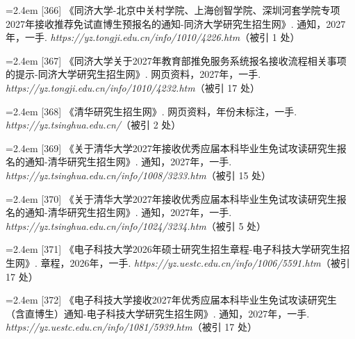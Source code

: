 {\vspace{0.6pt}
\noindent\hangindent=2.4em \label{src:S0488}{\color{cAccent}[366]} 《同济大学-北京中关村学院、上海创智学院、深圳河套学院专项2027年接收推荐免试直博生预报名的通知-同济大学研究生招生网》. 通知，2027年，一手. \textit{https://yz.tongji.edu.cn/info/1010/4226.htm}（被引 1 处）\par
\vspace{0.6pt}
\noindent\hangindent=2.4em \label{src:S0489}{\color{cAccent}[367]} 《同济大学关于2027年教育部推免服务系统报名接收流程相关事项的提示-同济大学研究生招生网》. 网页资料，2027年，一手. \textit{https://yz.tongji.edu.cn/info/1010/4232.htm}（被引 17 处）\par
\vspace{0.6pt}
\vspace{3.5pt}\par
\nopagebreak\vspace{1pt}
\noindent\hangindent=2.4em \label{src:S0490}{\color{cAccent}[368]} 《清华研究生招生网》. 网页资料，年份未标注，一手. \textit{https://yz.tsinghua.edu.cn/}（被引 2 处）\par
\vspace{0.6pt}
\noindent\hangindent=2.4em \label{src:S0491}{\color{cAccent}[369]} 《关于清华大学2027年接收优秀应届本科毕业生免试攻读研究生报名的通知-清华研究生招生网》. 通知，2027年，一手. \textit{https://yz.tsinghua.edu.cn/info/1008/3233.htm}（被引 15 处）\par
\vspace{0.6pt}
\noindent\hangindent=2.4em \label{src:S0492}{\color{cAccent}[370]} 《关于清华大学2027年接收优秀应届本科毕业生免试攻读研究生报名的通知-清华研究生招生网》. 通知，2027年，一手. \textit{https://yz.tsinghua.edu.cn/info/1024/3234.htm}（被引 5 处）\par
\vspace{0.6pt}
\vspace{3.5pt}\par
\nopagebreak\vspace{1pt}
\noindent\hangindent=2.4em \label{src:S0493}{\color{cAccent}[371]} 《电子科技大学2026年硕士研究生招生章程-电子科技大学研究生招生网》. 章程，2026年，一手. \textit{https://yz.uestc.edu.cn/info/1006/5591.htm}（被引 17 处）\par
\vspace{0.6pt}
\noindent\hangindent=2.4em \label{src:S0495}{\color{cAccent}[372]} 《电子科技大学接收2027年优秀应届本科毕业生免试攻读研究生（含直博生）通知-电子科技大学研究生招生网》. 通知，2027年，一手. \textit{https://yz.uestc.edu.cn/info/1081/5939.htm}（被引 17 处）\par
}
